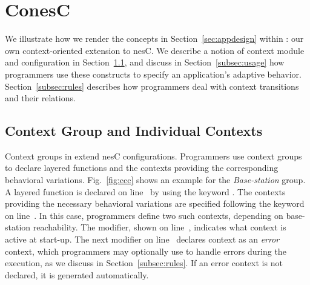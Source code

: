 \section{ConesC}\label{sec:conesc}

\vspace{-6mm}

We illustrate how we render the concepts in
Section~\ref{sec:appdesign} within \conesc: our own context-oriented
extension to nesC.  We describe a notion of context module and
configuration in Section~\ref{subsec:components}, and discuss in
Section~\ref{subsec:usage} how programmers use these constructs to
specify an application's adaptive behavior.
Section~\ref{subsec:rules} describes how \conesc programmers deal with
context transitions and their relations.

\subsection{Context Group and Individual Contexts}\label{subsec:components}


Context groups in \conesc extend nesC configurations. Programmers use
context groups to declare layered functions and the contexts providing
the corresponding behavioral variations. Fig.~\ref{fig:ccc} shows an
example for the \emph{Base-station} group. A layered 
function is declared on line~ by using the keyword
. The contexts providing the necessary behavioral
variations are specified following the keyword  on
line~. In this case, programmers define two such
contexts, depending on base-station reachability. The  modifier, shown on line~, indicates what
context is active at start-up. The next  modifier on
line~ declares context  as an
\emph{error} context, which programmers may optionally use to handle
errors during the execution, as we discuss in
Section~\ref{subsec:rules}. If an error context is not declared, it is
generated automatically.

